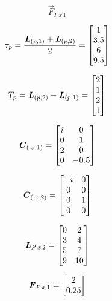 \documentclass[10pt]{report}
\begin{document}
\begin{equation*}
	\vec{F}_{F \, x \, 1}
\end{equation*}

\begin{equation*}
	\tau_p = \frac{\bm{\mathit{L}}_{(p, 1)} + \bm{\mathit{L}}_{(p, 2)}}{2} = 
	\begin{bmatrix}
		1 \\
		3.5 \\
		6 \\
		9.5 \\
	\end{bmatrix}
\end{equation*}

\begin{equation*}
	T_p = \bm{\mathit{L}}_{(p, 2)} - \bm{\mathit{L}}_{(p, 1)} =
	\begin{bmatrix}
		2 \\
		1 \\
		2 \\
		1 \\
	\end{bmatrix}
\end{equation*}


\begin{equation*}
	\bm{\mathit{C}}_{(:, :, 1)} = 
	\begin{bmatrix}
		i & 0 \\
		0 & 1 \\
		2 & 0 \\
		0 & -0.5 \\
	\end{bmatrix}
\end{equation*}

\begin{equation*}
	\bm{\mathit{C}}_{(:, :, 2)} = 
	\begin{bmatrix}
		-i & 0 \\
		0 & 0 \\
		0 & 1 \\
		0 & 0 \\
	\end{bmatrix}
\end{equation*}


\begin{equation*}
	\bm{\mathit{L}}_{P \, x \, 2} = 
	\begin{bmatrix}
		0 & 2 \\
		3 & 4 \\
		5 & 7 \\
		9 & 10 \\
	\end{bmatrix}
\end{equation*}

\begin{equation*}
	\bm{\mathit{F}}_{F \, x \, 1} = 
	\begin{bmatrix}
		2 \\
		0.25 \\
	\end{bmatrix}
\end{equation*}
\end{document}
